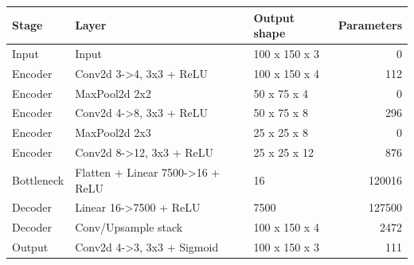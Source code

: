 \begin{tabular}{lllr}
\toprule
Stage & Layer & Output shape & Parameters \\
\midrule
Input & Input & 100 x 150 x 3 & 0 \\
Encoder & Conv2d 3->4, 3x3 + ReLU & 100 x 150 x 4 & 112 \\
Encoder & MaxPool2d 2x2 & 50 x 75 x 4 & 0 \\
Encoder & Conv2d 4->8, 3x3 + ReLU & 50 x 75 x 8 & 296 \\
Encoder & MaxPool2d 2x3 & 25 x 25 x 8 & 0 \\
Encoder & Conv2d 8->12, 3x3 + ReLU & 25 x 25 x 12 & 876 \\
Bottleneck & Flatten + Linear 7500->16 + ReLU & 16 & 120016 \\
Decoder & Linear 16->7500 + ReLU & 7500 & 127500 \\
Decoder & Conv/Upsample stack & 100 x 150 x 4 & 2472 \\
Output & Conv2d 4->3, 3x3 + Sigmoid & 100 x 150 x 3 & 111 \\
\bottomrule
\end{tabular}
